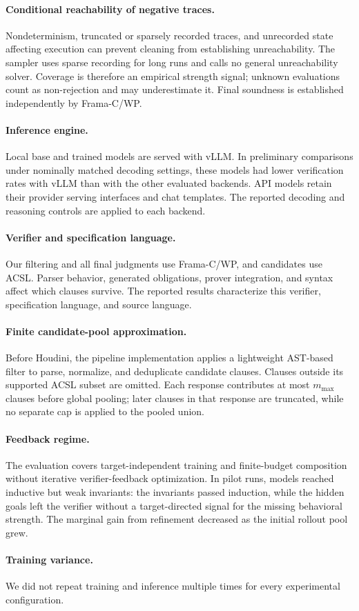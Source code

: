 \paragraph{Conditional reachability of negative traces.}
Nondeterminism, truncated or sparsely recorded traces, and unrecorded state
affecting execution can prevent cleaning from establishing unreachability.
The sampler uses sparse recording for long runs and calls no general
unreachability solver.  Coverage is therefore an empirical strength signal;
\textsf{unknown} evaluations count as non-rejection and may underestimate it.
Final soundness is established independently by Frama-C/WP.

\paragraph{Inference engine.}
Local base and trained models are served with vLLM.  In preliminary
comparisons under nominally matched decoding settings, these models had
lower verification rates with vLLM than with the other evaluated backends.
API models retain their provider serving interfaces and chat templates.  The
reported decoding and reasoning controls are applied to each backend.

\paragraph{Verifier and specification language.}
Our filtering and all final judgments use Frama-C/WP, and candidates use ACSL.
Parser behavior, generated obligations, prover integration, and syntax affect
which clauses survive.  The reported results characterize this verifier,
specification language, and source language.

\paragraph{Finite candidate-pool approximation.}
Before Houdini, the pipeline implementation applies a lightweight AST-based
filter to parse, normalize, and deduplicate candidate clauses.  Clauses outside
its supported ACSL subset are omitted.  Each response contributes at most
\(m_{\max}\) clauses before global pooling; later clauses in that response are
truncated, while no separate cap is applied to the pooled union.

\paragraph{Feedback regime.}
The evaluation covers target-independent training and finite-budget
composition without iterative verifier-feedback optimization.  In pilot runs,
models reached inductive but weak invariants: the invariants passed induction,
while the hidden goals left the verifier without a target-directed signal for
the missing behavioral strength.  The marginal gain from refinement decreased
as the initial rollout pool grew.

\paragraph{Training variance.}
We did not repeat training and inference multiple times for every experimental
configuration.
